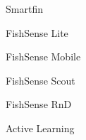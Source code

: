 \item Smartfin
\item FishSense Lite
\item FishSense Mobile
\item FishSense Scout
\item FishSense RnD
\item Active Learning
